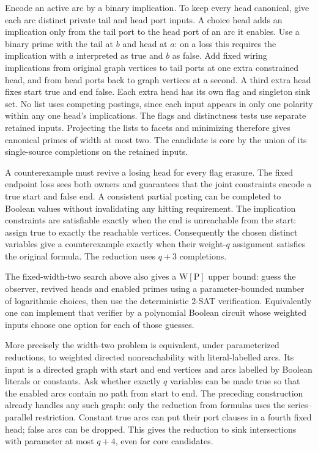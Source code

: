 Encode an active arc by a binary implication.
To keep every head canonical, give each arc
distinct private tail and head port inputs. A
choice head adds an implication only from the
tail port to the head port of an arc it enables.
Use a binary prime with the tail at $b$ and
head at $a$: on a loss this requires the
implication with $a$ interpreted as true
and $b$ as false. Add fixed wiring implications
from original graph vertices to tail ports
at one extra constrained head, and from head
ports back to graph vertices at a second.
A third extra head fixes start true and end
false. Each extra head has its own flag and
singleton sink set. No list uses competing
postings, since each input appears in only
one polarity within any one head's implications.
The flags and distinctness tests use separate
retained inputs. Projecting the lists to facets
and minimizing therefore gives canonical
primes of width at most two. The candidate is
core by the union of its single-source
completions on the retained inputs.

A counterexample must revive a losing head
for every flag erasure. The fixed endpoint
loss sees both owners and guarantees that the
joint constraints encode a true start and
false end. A consistent partial posting can
be completed to Boolean values without
invalidating any hitting requirement.
The implication constraints are satisfiable
exactly when the end is unreachable from
the start: assign true to exactly the
reachable vertices. Consequently the chosen
distinct variables give a counterexample
exactly when their weight-$q$ assignment
satisfies the original formula. The reduction
uses $q+3$ completions.

The fixed-width-two search above also gives
a $\mathrm{W[P]}$ upper bound: guess the
observer, revived heads and enabled primes
using a parameter-bounded number of logarithmic
choices, then use the deterministic $2$-SAT
verification. Equivalently one can implement
that verifier by a polynomial Boolean circuit
whose weighted inputs choose one option for
each of those guesses.

More precisely the width-two problem is equivalent,
under parameterized reductions, to weighted directed
nonreachability with literal-labelled arcs. Its input
is a directed graph with start and end vertices and
arcs labelled by Boolean literals or constants. Ask
whether exactly $q$ variables can be made true so
that the enabled arcs contain no path from start
to end. The preceding construction already handles
any such graph: only the reduction from formulas
uses the series--parallel restriction. Constant true
arcs can put their port clauses in a fourth fixed
head; false arcs can be dropped. This gives the
reduction to sink intersections with parameter at
most $q+4$, even for core candidates.

